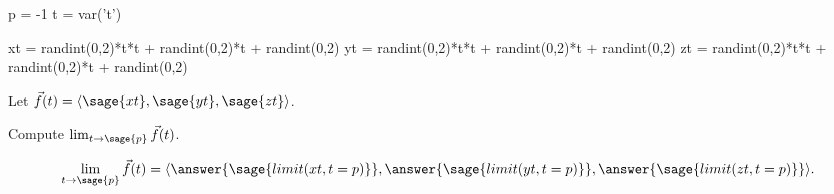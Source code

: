\documentclass{ximera}
\author{Jim Fowler}
\begin{document}
\begin{sagesilent}
  p = -1
  t = var('t')
  
  xt = randint(0,2)*t*t + randint(0,2)*t + randint(0,2)
  yt = randint(0,2)*t*t + randint(0,2)*t + randint(0,2)
  zt = randint(0,2)*t*t + randint(0,2)*t + randint(0,2)
\end{sagesilent}

\begin{exercise}

  Let $\vec{f}(t) = \langle \sage{xt}, \sage{yt}, \sage{zt} \rangle$.

  Compute $\lim_{t \to \sage{p}} \vec{f}(t)$.

  \[
    \lim_{t \to \sage{p}} \vec{f}(t) = \langle \answer{\sage{limit(xt,t=p)}}, \answer{\sage{limit(yt,t=p)}}, \answer{\sage{limit(zt,t=p)}} \rangle.
  \]
  

  
\end{exercise}
\end{document}
